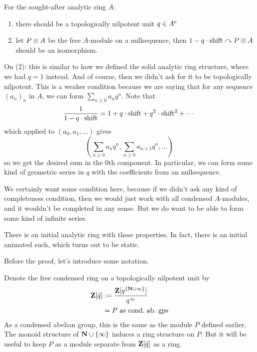 \begin{desiderata}
  For the sought-after analytic ring $A$:
  \begin{enumerate}
    \item there should be a topologically nilpotent unit $q\in A^\triangleright$
    \item let $P\otimes A$ be the free $A$-module on a nullsequence, then $1-q\cdot\mathrm{shift}\curvearrowright P\otimes A$ should be an isomorphism.
  \end{enumerate}

  On (2): this is  similar to how we defined the solid analytic ring structure, where we had $q=1$ instead. And of course, then we didn't ask for it to be topologically nilpotent. This is a weaker condition because we are saying that for any sequence $(a_n)_n$ in $A$, we can form $\sum_{n\ge0} a_n q^n$. Note that
  \[
    \frac1{1-q\cdot\mathrm{shift}} = 1 + q \cdot\mathrm{shift} + q^2 \cdot\mathrm{shift}^2 + \dotsb
  \]
  which applied to $(a_0,a_1,\dotsc)$ gives
  \[ \left(\sum_{n\ge0} a_n q^n, \sum_{n\ge0} a_{n+1} q^n, \dotsc\right) \]
  so we get the desired sum in the $0$th component. In particular, we can form some kind of geometric series in $q$ with the coefficients from an nullsequence.

  We certainly want some condition here, because if we didn't ask any kind of completeness condition, then we would just work with all condensed $A$-modules, and it wouldn't be completed in any sense. But we do want to be able to form some kind of infinite series.
\end{desiderata}

\begin{proposition}
  There is an initial analytic ring with these properties. In fact, there is an initial animated such, which turns out to be static.
\end{proposition}

Before the proof, let's introduce some notation.

\begin{definition}
  Denote the free condensed ring on a topologically nilpotent unit by
  \begin{align*}
    \mathbf Z[\hat q]
      &\mathrel{:=} \frac{\mathbf Z[q^{\{\mathbf N\cup\infty\}}]}{q^\infty}\\
      &= P \text{ as cond.\ ab.\ gps}
  \end{align*}
  As a condensed abelian group, this is the same as the module $P$ defined earlier. The monoid structure of $\mathbf N\cup\{\infty\}$ induces a ring structure on $P$. But it will be useful to keep $P$ as a module separate from $\mathbf Z[\hat q]$ as a ring.
\end{definition}

